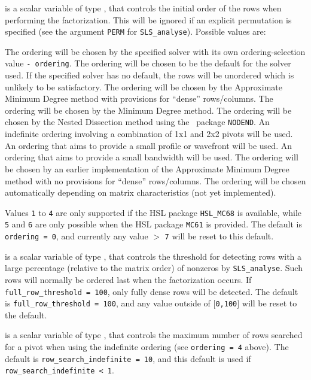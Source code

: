 \documentclass{galahad}
\newcommand{\packagename}{SLS}
\begin{document}
\begin{description}
 is a scalar variable of type \integer, that
controls the initial order of the rows when performing the factorization.
This will be ignored if an explicit permutation is specified (see the
argument {\tt PERM} for {\tt \packagename\_analyse}).
Possible values are:
\begin{description}
 The ordering will be chosen by the specified solver with its
        own ordering-selection value {\tt - ordering}.
 The ordering will be chosen to be the default for the solver used.
        If the specified solver has no default, the rows will be unordered
        which is unlikely to be satisfactory.
 The ordering will be chosen by the Approximate Minimum Degree method
       with provisions for ``dense'' rows/columns.
 The ordering will be chosen by the Minimum Degree method.
 The ordering will be chosen by the Nested Dissection method using
         the \galahad\ package {\tt NODEND}.
 An indefinite ordering involving a combination of 1x1 and 2x2 pivots
       will be used.
 An ordering that aims to provide a small profile or wavefront
       will be used.
 An ordering that aims to provide a small bandwidth will be used.
 The ordering will be chosen by an earlier implementation of 
        the Approximate Minimum Degree method with no provisions 
        for ``dense'' rows/columns.
 The ordering will be chosen automatically depending on matrix
       characteristics (not yet implemented).
\end{description}
Values {\tt 1} to {\tt 4} are only supported if the HSL package {\tt HSL\_MC68}
is available, while {\tt 5} and {\tt 6} are only possible
when the HSL package {\tt MC61} is provided.
The default is {\tt ordering = 0}, and currently any value $>$ {\tt 7} will
be reset to this default.

 is a scalar variable of type \integer,
that controls the threshold for detecting rows with a large percentage
(relative to the matrix order) of nonzeros by {\tt \packagename\_analyse}.
Such rows will normally be ordered last when the factorization occurs.
If {\tt full\_row\_threshold = 100}, only fully dense
rows will be detected.
The default is {\tt full\_row\_threshold = 100},
and any value outside of $[${\tt 0,100}$]$ will be reset to the default.

 is a scalar variable of type \integer,
that controls the maximum number of rows searched for a pivot when using the
indefinite ordering (see {\tt ordering = 4} above).
The default is {\tt row\_search\_\-indefinite = 10},
and this default is used if {\tt row\_search\_\-indefinite < 1}.


\end{description}
\end{document}
